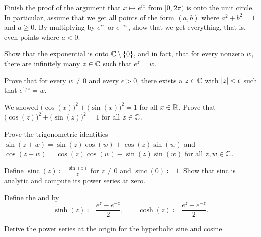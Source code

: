 \begin{exercise}
Finish the proof of the argument that $x \mapsto e^{ix}$ from
$[0,2\pi)$ is onto the unit circle.  In particular, assume that
we get all points of the form $(a,b)$ where $a^2+b^2=1$ and $a \geq 0$.
By multiplying by $e^{i\pi}$ or $e^{-i\pi}$, show that we get everything,
that is, even points where $a < 0$.
\end{exercise}

\begin{exercise}
Show that the exponential is onto ${\mathbb{C}} \setminus \{ 0 \}$, and in fact,
that for every nonzero $w$, there are infinitely many $z \in {\mathbb{C}}$ such that $e^z=w$.
\end{exercise}

\begin{exercise}
Prove that for every $w \not= 0$ and every $\epsilon > 0$,
there exists a $z \in {\mathbb{C}}$ with $\lvert {z} \rvert < \epsilon$ such that $e^{1/z} = w$.
\end{exercise}

\begin{exercise}\label{exercise:cossinidentity}
We showed
${\bigl( \cos(x) \bigr)}^2 + {\bigl( \sin(x) \bigr)}^2 = 1$
for all $x \in {\mathbb{R}}$.
Prove that
${\bigl( \cos(z) \bigr)}^2 + {\bigl( \sin(z) \bigr)}^2 = 1$
for all $z \in {\mathbb{C}}$.
\end{exercise}

\begin{exercise}
Prove the trigonometric identities
$\sin(z + w) = \sin(z) \cos(w) + \cos(z) \sin(w)$ and
$\cos(z + w) = \cos(z) \cos(w) - \sin(z) \sin(w)$ for all $z,w \in {\mathbb{C}}$.
\end{exercise}

\begin{exercise}
Define $\operatorname{sinc}(z) \coloneqq \frac{\sin(z)}{z}$ for $z \not=0$ and
$\operatorname{sinc}(0) \coloneqq 1$.
Show that sinc is analytic and compute its power series at zero.
\end{exercise}

\begin{exnote}
\pagebreak[2]
Define the \emph{} and
\emph{} by
\begin{equation*}
\sinh(z) \coloneqq \frac{e^z-e^{-z}}{2}, \qquad
\cosh(z) \coloneqq \frac{e^z+e^{-z}}{2}.
\end{equation*}
\end{exnote}

\begin{exercise}
Derive the power series at the origin for the hyperbolic sine and cosine.
\end{exercise}

